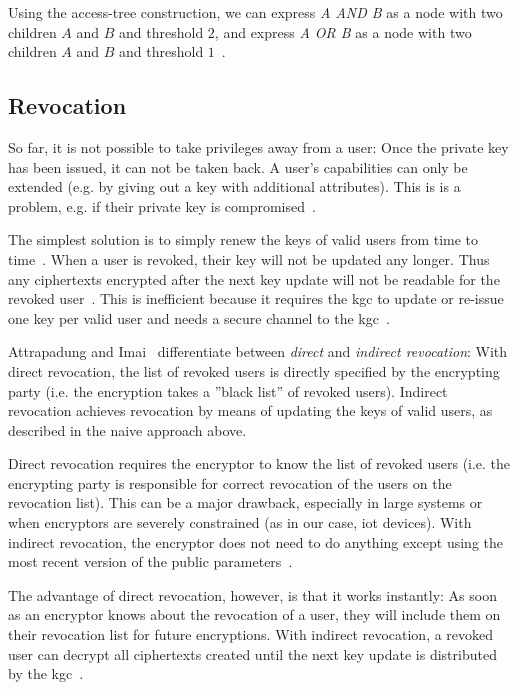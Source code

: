 Using the \gls{access-tree} construction, we can express \emph{A AND B} as a node with two children $A$ and $B$ and threshold $2$, and express \emph{A OR B} as a node with two children $A$ and $B$ and threshold $1$~\cite{yao_lightweight_2015}.

\subsection{Revocation}
So far, it is not possible to take privileges away from a user:
Once the private key has been issued, it can not be taken back.
A user's capabilities can only be extended (e.g. by giving out a key with additional attributes).
This is is a problem, e.g. if their private key is compromised~\cite{boldyreva_identity-based_2008}.

The simplest solution is to simply renew the keys of valid users from time to time~\cite{boldyreva_identity-based_2008}.
When a user is revoked, their key will not be updated any longer. Thus any ciphertexts encrypted after the next key update will not be readable for the revoked user~\cite{boldyreva_identity-based_2008}.
This is inefficient because it requires the \acrshort{kgc} to update or re-issue one key per valid user and needs a secure channel to the \acrshort{kgc}~\cite{boldyreva_identity-based_2008}.

Attrapadung and Imai~\cite{attrapadung_attribute-based_2009} differentiate between \emph{direct} and \emph{indirect revocation}: 
With direct revocation, the list of revoked users is directly specified by the encrypting party (i.e. the encryption takes a ''black list'' of revoked users).
Indirect revocation achieves revocation by means of updating the keys of valid users, as described in the naive approach above.

Direct revocation requires the encryptor to know the list of revoked users \cite{attrapadung_attribute-based_2009} (i.e. the encrypting party is responsible for correct revocation of the users on the revocation list).
This can be a major drawback, especially in large systems or when encryptors are severely constrained (as in our case, \acrshort{iot} devices).
With indirect revocation, the encryptor does not need to do anything except using the most recent version of the public parameters~\cite{attrapadung_attribute-based_2009}.

The advantage of direct revocation, however, is that it works instantly: As soon as an encryptor knows about the revocation of a user, they will include them on their revocation list for future encryptions.
With indirect revocation, a revoked user can decrypt all ciphertexts created until the next key update is distributed by the \acrshort{kgc}~\cite{attrapadung_attribute-based_2009}.


